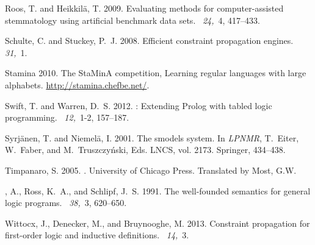 \documentclass{tlp}
\renewcommand{\|}{\ensuremath{\,|\,}}
\renewcommand{\|}{\,|\,}
\begin{document}
\begin{thebibliography}{}
{\sc Roos, T.} {\sc and} {\sc Heikkil\"a, T.} 2009.
\newblock Evaluating methods for computer-assisted stemmatology using
  artificial benchmark data sets.
~{\em 24,\/}~4, 417–433.

{\sc Schulte, C.} {\sc and} {\sc Stuckey, P.~J.} 2008.
\newblock Efficient constraint propagation engines.
~{\em
  31,\/}~1.

Stamina 2010.
\newblock The {StaMinA} competition, {L}earning regular languages with large
  alphabets.
\newblock \url{http://stamina.chefbe.net/}.

{\sc Swift, T.} {\sc and} {\sc Warren, D.~S.} 2012.
: {E}xtending {P}rolog with tabled logic programming.
~{\em 12,\/}~1-2,
  157--187.

{\sc Syrj{\"a}nen, T.} {\sc and} {\sc Niemel{\"a}, I.} 2001.
\newblock The smodels system.
\newblock In {\em LPNMR}, {T.~Eiter}, {W.~Faber}, {and} {M.~Truszczy{\'n}ski},
  Eds. LNCS, vol. 2173. Springer, 434--438.

{\sc Timpanaro, S.} 2005.
.
\newblock University of Chicago Press.
\newblock Translated by Most, {G.W.}

{, A.}, {\sc Ross, K.~A.}, {\sc and} {\sc Schlipf, J.~S.} 1991.
\newblock The well-founded semantics for general logic programs.
~{\em 38,\/}~3, 620--650.

{\sc Wittocx, J.}, {\sc Denecker, M.}, {\sc and} {\sc Bruynooghe, M.} 2013.
\newblock Constraint propagation for first-order logic and inductive
  definitions.
~{\em 14,\/}~3.


\end{thebibliography}
\end{document}
